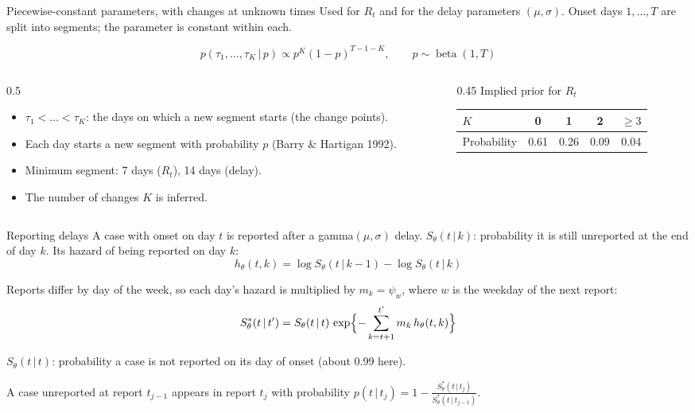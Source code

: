 \documentclass[aspectratio=169,9pt]{beamer}
\newcommand{\given}{\,|\,}
\begin{document}
\begin{frame}{Piecewise-constant parameters, with changes at unknown times}
Used for $R_t$ and for the delay parameters $(\mu,\sigma)$. Onset days
$1,\dots,T$ are split into segments; the parameter is constant within each.

\medskip
\[
p(\tau_1,\dots,\tau_K\given p)\propto p^{K}(1-p)^{T-1-K},\qquad
p\sim\operatorname{beta}(1,T)
\]

\begin{columns}[c]
\begin{column}{0.5\textwidth}
\begin{itemize}
\item $\tau_1<\dots<\tau_K$: the days on which a new segment starts (the
change points).
\item Each day starts a new segment with probability $p$ (Barry \& Hartigan
1992).
\item Minimum segment: 7 days ($R_t$), 14 days (delay).
\item The number of changes $K$ is inferred.
\end{itemize}
\end{column}
\begin{column}{0.45\textwidth}
\centering
Implied prior for $R_t$

\smallskip
\begin{tabular}{lcccc}
\toprule
$K$ & 0 & 1 & 2 & $\ge 3$ \\
\midrule
Probability & 0.61 & 0.26 & 0.09 & 0.04 \\
\bottomrule
\end{tabular}
\end{column}
\end{columns}
\end{frame}

\begin{frame}{Reporting delays}
A case with onset on day $t$ is reported after a gamma$(\mu,\sigma)$ delay.
$S_\theta(t\given k)$: probability it is still unreported at the end of day
$k$. Its hazard of being reported on day $k$:
\[
h_\theta(t,k)=\log S_\theta(t\given k-1)-\log S_\theta(t\given k)
\]

\smallskip
Reports differ by day of the week, so each day's hazard is multiplied by
$m_k=\psi_w$, where $w$ is the weekday of the next report:
\[
S^{*}_\theta(t\given t')=S_\theta(t\given t)\,
\exp\Bigl\{-\sum_{k=t+1}^{t'}m_k\,h_\theta(t,k)\Bigr\}
\]

{\small $S_\theta(t\given t)$: probability a case is not reported on its day
of onset (about 0.99 here).}

\smallskip
A case unreported at report $t_{j-1}$ appears in report $t_j$ with
probability
$\displaystyle p(t\given t_j)=1-\frac{S^{*}_\theta(t\given t_j)}{S^{*}_\theta(t\given t_{j-1})}$.
\end{frame}
\end{document}

